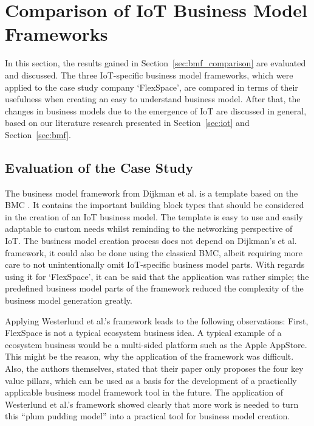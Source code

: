 \section{Comparison of IoT Business Model Frameworks}
\label{sec:eval}
\vspace{-1em}
	In this section, the results gained in Section~\ref{sec:bmf_comparison} are evaluated and discussed. The three IoT-specific business model frameworks, which were applied to the case study company `FlexSpace', are compared in terms of their usefulness when creating an easy to understand business model. After that, the changes in business models due to the emergence of IoT are discussed in general, based on our literature research presented in Section~\ref{sec:iot} and Section~\ref{sec:bmf}.
	\vspace{-2em}

		\subsection{Evaluation of the Case Study}
		\vspace{-1em}
		The business model framework from Dijkman et al. \cite{dijkman} is a template based on the BMC \cite{bmc}. It contains the important building block types that should be considered in the creation of an IoT business model. The template is easy to use and easily adaptable to custom needs whilst reminding to the networking perspective of IoT. The business model creation process does not depend on Dijkman's et al. framework, it could also be done using the classical BMC, albeit requiring more care to not unintentionally omit IoT-specific business model parts. With regards using it for `FlexSpace', it can be said that the application was rather simple; the predefined business model parts of the framework reduced the complexity of the business model generation greatly.
		
		Applying Westerlund et al.'s framework leads to the following observations: First, FlexSpace is not a typical ecosystem business idea. A typical example of a ecosystem business would be a multi-sided platform such as the Apple AppStore. This might be the reason, why the application of the framework was difficult. Also, the authors themselves, stated that their paper only proposes the four key value pillars, which can be used as a basis for the development of a practically applicable business model framework tool in the future. The application of Westerlund et al.'s framework showed clearly that more work is needed to turn this ``plum pudding model'' \cite{westerlund} into a practical tool for business model creation.
		
